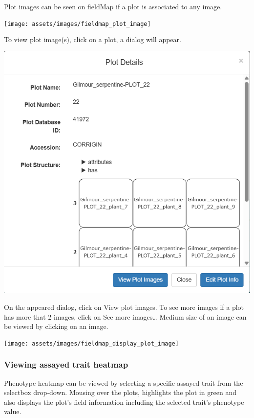 \documentclass[
  12pt,
]{book}
\begin{document}
Plot images can be seen on fieldMap if a plot is associated to any image.

\begin{center}\texttt{[image: assets/images/fieldmap\_plot\_image]} \end{center}

To view plot image(s), click on a plot, a dialog will appear.

\begin{center}\includegraphics[width=0.95\linewidth]{assets/images/fieldmap_view_plot_image} \end{center}

On the appeared dialog, click on View plot images. To see more images if a plot has more that 2 images, click on See more images\ldots{} Medium size of an image can be viewed by clicking on an image.

\begin{center}\texttt{[image: assets/images/fieldmap\_display\_plot\_image]} \end{center}

\hypertarget{viewing-assayed-trait-heatmap}{%
\subsubsection*{Viewing assayed trait heatmap}\label{viewing-assayed-trait-heatmap}}


Phenotype heatmap can be viewed by selecting a specific assayed trait from the selectbox drop-down. Mousing over the plots, highlights the plot in green and also displays the plot's field information including the selected trait's phenotype value.
\end{document}
